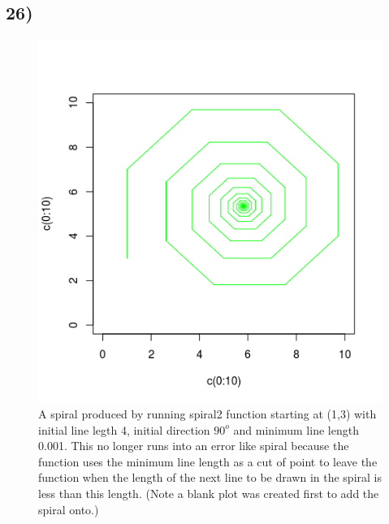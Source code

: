 \documentclass[11pt]{article}
\begin{document}
\subsection*{26)}
\begin{figure}[H]
\begin{center}
\includegraphics[scale=0.5]{../Results/Plots/Spiral2.png}
\caption{A spiral produced by running spiral2 function starting at (1,3) with initial line legth 4, initial direction $90^{o}$ and minimum line length 0.001. This no longer runs into an error like spiral because the function uses the minimum line length as a cut of point to leave the function when the length of the next line to be drawn in the spiral is less than this length. (Note a blank plot was created first to add the spiral onto.)}
\end{center}
\end{figure}
\end{document}
